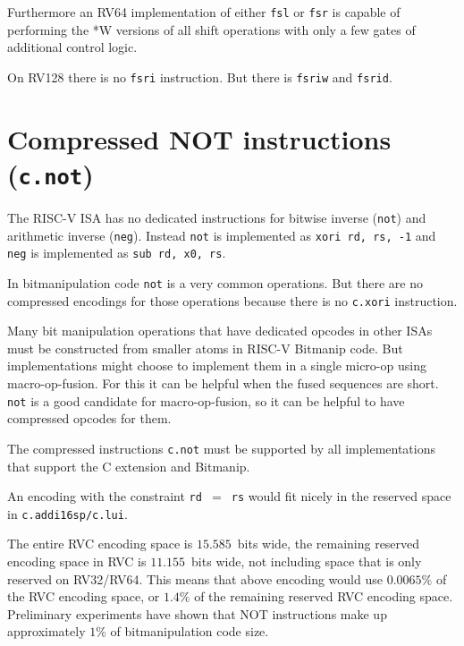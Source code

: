 Furthermore an RV64 implementation of either {\tt fsl} or {\tt fsr} is capable
of performing the *W versions of all shift operations with only a few gates
of additional control logic.

On RV128 there is no {\tt fsri} instruction. But there is {\tt fsriw} and {\tt fsrid}.


\section{Compressed NOT instructions (\texttt{c.not})}

The RISC-V ISA has no dedicated instructions for bitwise inverse (\texttt{not})
and arithmetic inverse (\texttt{neg}). Instead \texttt{not} is implemented as
\texttt{xori\ rd,\ rs,\ -1} and \texttt{neg} is implemented as \texttt{sub\ rd,\ x0,\ rs}.

In bitmanipulation code \texttt{not} is a very common operations. But there are
no compressed encodings for those operations because there is no
\texttt{c.xori} instruction.

Many bit manipulation operations that have dedicated opcodes in other ISAs
must be constructed from smaller atoms in RISC-V Bitmanip code. But
implementations might choose to implement them in a single micro-op using
macro-op-fusion. For this it can be helpful when the fused sequences are short.
\texttt{not} is a good candidate for macro-op-fusion, so it can be helpful to
have compressed opcodes for them.

The compressed instructions \texttt{c.not} must be supported by all
implementations that support the C extension and Bitmanip.

An encoding with the constraint \texttt{rd $=$ rs} would fit nicely in the reserved
space in \texttt{c.addi16sp/c.lui}.



The entire RVC encoding space is $15.585$~bits wide, the remaining reserved
encoding space in RVC is $11.155$~bits wide, not including space that is only
reserved on RV32/RV64. This means that above encoding would use $0.0065\%$ of
the RVC encoding space, or $1.4\%$ of the remaining reserved RVC encoding
space. Preliminary experiments have shown that NOT instructions make up
approximately $1\%$ of bitmanipulation code size.~\cite{Wolf17A}


